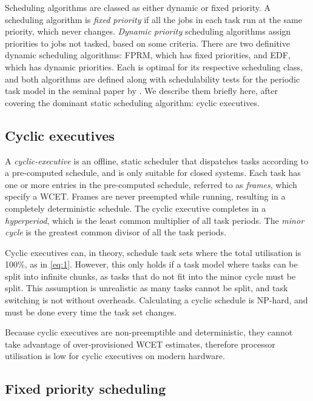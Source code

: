 Scheduling algorithms are classed as either dynamic or fixed priority. A scheduling algorithm 
is \emph{fixed priority} if all the jobs in each task run at the same priority, which never changes. 
\emph{Dynamic priority} scheduling algorithms assign priorities to jobs not tasked, based on some criteria. 
There are two definitive dynamic scheduling  algorithms: \gls{FPRM}, which has fixed priorities, and
\gls{EDF}, which has dynamic priorities. Each is optimal for its respective scheduling class,  and both algorithms are defined along with
schedulability tests for the periodic task model in the seminal paper by \citet{Liu_Layland_73}. We
describe them briefly here, after covering the dominant static scheduling algorithm: cyclic
executives. 

\subsection{Cyclic executives}
\label{s:cyclic-executive}

A \emph{cyclic-executive} is an offline, static scheduler that dispatches tasks according to a pre-computed schedule, and is only
suitable for closed systems. Each task
has one or more entries in the pre-computed schedule, referred to as \emph{frames}, which specify a
\gls{WCET}. Frames are never preempted while running, resulting in a completely deterministic
schedule. The cyclic executive completes in a
\emph{hyperperiod}, which is the least common multiplier of all task periods. The \emph{minor cycle}
is the greatest common divisor of all the task periods.

Cyclic executives can, in theory, schedule task sets where the total utilisation is 100\%, as in \cref{eq:1}.
However, this only holds
if a task model where tasks can be split into infinite chunks, as tasks that do not fit into the
minor cycle must be split. This assumption is unrealistic as many tasks
cannot be split, and task switching is not without overheads. Calculating a cyclic schedule is
NP-hard, and must be done every time the task set changes.

Because cyclic executives are non-preemptible and deterministic, they cannot take advantage of 
over-provisioned \gls{WCET} estimates, therefore processor utilisation is low
for cyclic executives on modern hardware. 

\subsection{Fixed priority scheduling}
\label{s:fp}

